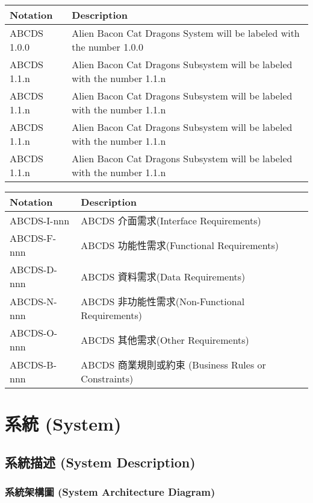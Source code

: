 \documentclass[a4paper, 12pt]{article}
\begin{document}
\newcommand{\notationDescTableCol}{ | p{6.5em} | p{32em} |}

\noindent \begin{tabular}{\notationDescTableCol}
  \hline
  Notation & Description \\
  \hline
  ABCDS 1.0.0 & Alien Bacon Cat Dragons System will be labeled with the number 1.0.0 \\
  ABCDS 1.1.n & Alien Bacon Cat Dragons Subsystem will be labeled with the number 1.1.n \\
  ABCDS 1.1.n & Alien Bacon Cat Dragons Subsystem will be labeled with the number 1.1.n \\
  ABCDS 1.1.n & Alien Bacon Cat Dragons Subsystem will be labeled with the number 1.1.n \\
  ABCDS 1.1.n & Alien Bacon Cat Dragons Subsystem will be labeled with the number 1.1.n \\
  \hline
\end{tabular} \par

\noindent \begin{tabular}{\notationDescTableCol}
  \hline
  Notation & Description \\
  \hline
  ABCDS-I-nnn & ABCDS 介面需求(Interface Requirements) \\
  ABCDS-F-nnn & ABCDS 功能性需求(Functional Requirements) \\
  ABCDS-D-nnn & ABCDS 資料需求(Data Requirements) \\
  ABCDS-N-nnn & ABCDS 非功能性需求(Non-Functional Requirements) \\
  ABCDS-O-nnn & ABCDS 其他需求(Other Requirements) \\
  ABCDS-B-nnn & ABCDS 商業規則或約束 (Business Rules or Constraints) \\
  \hline
\end{tabular} \par

\newpage

\section{系統 (System)}
\subsection{系統描述 (System Description)}
\subsubsection{系統架構圖 (System Architecture Diagram) }
\end{document}

